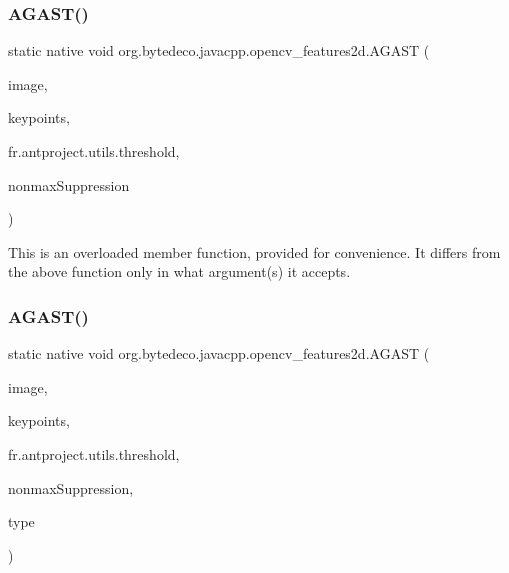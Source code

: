 \subsubsection{\texorpdfstring{A\+G\+A\+S\+T()}{AGAST()}\hspace{0.1cm}{\footnotesize\ttfamily [1/2]}}
{\footnotesize\ttfamily static native void org.\+bytedeco.\+javacpp.\+opencv\+\_\+features2d.\+A\+G\+A\+ST (\begin{DoxyParamCaption}\item[{@By\+Val Mat}]{image,  }\item[{@By\+Ref Key\+fr.antproject.utils.Point\+Vector}]{keypoints,  }\item[{int}]{fr.antproject.utils.threshold,  }\item[{@Cast(\char`\"{}bool\char`\"{}) boolean}]{nonmax\+Suppression }\end{DoxyParamCaption})\hspace{0.3cm}{\ttfamily [static]}}

This is an overloaded member function, provided for convenience. It differs from the above function only in what argument(s) it accepts. \mbox{\label{group__features2d__main_ga2126ee1b1b70316ae0fd6ffb3d2d51bc}} 
\subsubsection{\texorpdfstring{A\+G\+A\+S\+T()}{AGAST()}\hspace{0.1cm}{\footnotesize\ttfamily [2/2]}}
{\footnotesize\ttfamily static native void org.\+bytedeco.\+javacpp.\+opencv\+\_\+features2d.\+A\+G\+A\+ST (\begin{DoxyParamCaption}\item[{@By\+Val Mat}]{image,  }\item[{@By\+Ref Key\+fr.antproject.utils.Point\+Vector}]{keypoints,  }\item[{int}]{fr.antproject.utils.threshold,  }\item[{@Cast(\char`\"{}bool\char`\"{}) boolean}]{nonmax\+Suppression,  }\item[{int}]{type }\end{DoxyParamCaption})\hspace{0.3cm}{\ttfamily [static]}}



